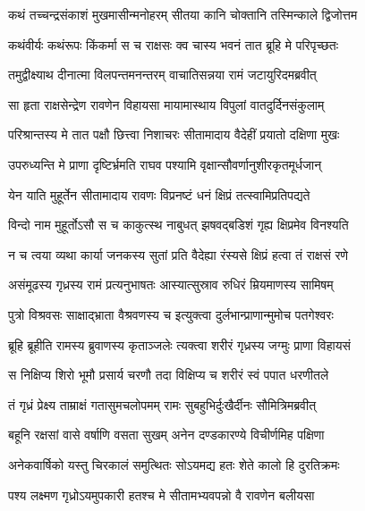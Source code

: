\twolineshloka
{कथं तच्चन्द्रसंकाशं मुखमासीन्मनोहरम्}
{सीतया कानि चोक्तानि तस्मिन्काले द्विजोत्तम} %

\twolineshloka
{कथंवीर्यः कथंरूपः किंकर्मा स च राक्षसः}
{क्व चास्य भवनं तात ब्रूहि मे परिपृच्छतः} %

\twolineshloka
{तमुद्वीक्ष्याथ दीनात्मा विलपन्तमनन्तरम्}
{वाचातिसन्नया रामं जटायुरिदमब्रवीत्} %

\twolineshloka
{सा हृता राक्षसेन्द्रेण रावणेन विहायसा}
{मायामास्थाय विपुलां वातदुर्दिनसंकुलाम्} %

\twolineshloka
{परिश्रान्तस्य मे तात पक्षौ छित्त्वा निशाचरः}
{सीतामादाय वैदेहीं प्रयातो दक्षिणा मुखः} %

\twolineshloka
{उपरुध्यन्ति मे प्राणा दृष्टिर्भ्रमति राघव}
{पश्यामि वृक्षान्सौवर्णानुशीरकृतमूर्धजान्} %

\twolineshloka
{येन याति मुहूर्तेन सीतामादाय रावणः}
{विप्रनष्टं धनं क्षिप्रं तत्स्वामिप्रतिपद्यते} %

\twolineshloka
{विन्दो नाम मुहूर्तोऽसौ स च काकुत्स्थ नाबुधत्}
{झषवद्बडिशं गृह्य क्षिप्रमेव विनश्यति} %

\twolineshloka
{न च त्वया व्यथा कार्या जनकस्य सुतां प्रति}
{वैदेह्या रंस्यसे क्षिप्रं हत्वा तं राक्षसं रणे} %

\twolineshloka
{असंमूढस्य गृध्रस्य रामं प्रत्यनुभाषतः}
{आस्यात्सुस्राव रुधिरं म्रियमाणस्य सामिषम्} %

\twolineshloka
{पुत्रो विश्रवसः साक्षाद्भ्राता वैश्रवणस्य च}
{इत्युक्त्वा दुर्लभान्प्राणान्मुमोच पतगेश्वरः} %

\twolineshloka
{ब्रूहि ब्रूहीति रामस्य ब्रुवाणस्य कृताञ्जलेः}
{त्यक्त्वा शरीरं गृध्रस्य जग्मुः प्राणा विहायसं} %

\twolineshloka
{स निक्षिप्य शिरो भूमौ प्रसार्य चरणौ तदा}
{विक्षिप्य च शरीरं स्वं पपात धरणीतले} %

\twolineshloka
{तं गृध्रं प्रेक्ष्य ताम्राक्षं गतासुमचलोपमम्}
{रामः सुबहुभिर्दुःखैर्दीनः सौमित्रिमब्रवीत्} %

\twolineshloka
{बहूनि रक्षसां वासे वर्षाणि वसता सुखम्}
{अनेन दण्डकारण्ये विचीर्णमिह पक्षिणा} %

\twolineshloka
{अनेकवार्षिको यस्तु चिरकालं समुत्थितः}
{सोऽयमद्य हतः शेते कालो हि दुरतिक्रमः} %

\twolineshloka
{पश्य लक्ष्मण गृध्रोऽयमुपकारी हतश्च मे}
{सीतामभ्यवपन्नो वै रावणेन बलीयसा} %

